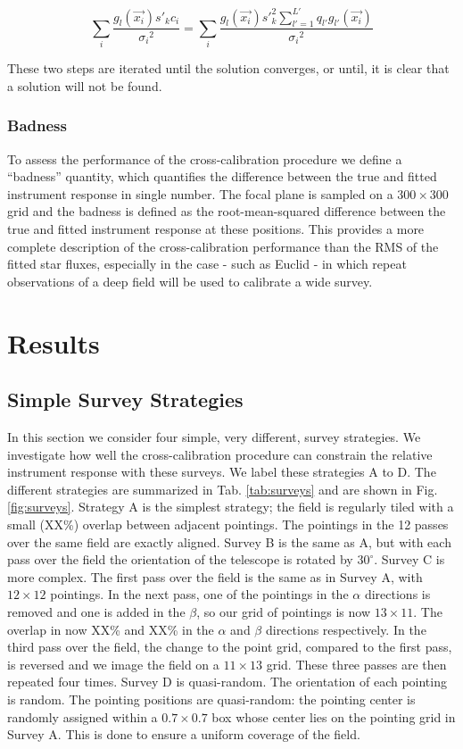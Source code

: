 \documentclass[manuscript]{aastex}
\begin{document}
\begin{displaymath}
\sum_{i} \frac{g_l(\vec{x_i}) s'_{k} c_i}{{\sigma_i}^2} = \sum_{i} \frac{g_l (\vec{x_i}) s'^2_{k} \sum_{l' = 1}^{L'} q_{l'} g_{l'} (\vec{x_i})} {{\sigma_i}^2}
\end{displaymath}

These two steps are iterated until the solution converges, or until, it is clear that a solution will not be found. 

\subsubsection{Badness}
To assess the performance of the cross-calibration procedure we define a ``badness'' quantity, which quantifies the difference between the true and fitted instrument response in single number. The focal plane is sampled on a $300 \times 300$ grid and the badness is defined as the root-mean-squared difference between the true and fitted instrument response at these positions. This provides a more complete description of the cross-calibration performance than the RMS of the fitted star fluxes, especially in the case - such as Euclid - in which repeat observations of a deep field will be used to calibrate a wide survey.

\section{Results}
\subsection{Simple Survey Strategies}
In this section we consider four simple, very different, survey strategies. We investigate how well the cross-calibration procedure can constrain the relative instrument response with these surveys. We label these strategies A to D. The different strategies are summarized in Tab. \ref{tab:surveys} and are shown in Fig. \ref{fig:surveys}. Strategy A is the simplest strategy; the field is regularly tiled with a small (XX\%) overlap between adjacent pointings. The pointings in the 12 passes over the same field are exactly aligned. Survey B is the same as A, but with each pass over the field the orientation of the telescope is rotated by $30^\circ$. Survey C is more complex. The first pass over the field is the same as in Survey A, with $12 \times 12$ pointings. In the next pass, one of the pointings in the $\alpha$ directions is removed and one is added in the $\beta$, so our grid of pointings is now $13 \times 11$. The overlap in now XX\% and XX\% in the $\alpha$ and $\beta$ directions respectively. In the third pass over the field, the change to the point grid, compared to the first pass, is reversed and we image the field on a $11 \times 13$ grid. These three passes are then repeated four times. Survey D is quasi-random. The orientation of each pointing is random. The pointing positions are quasi-random: the pointing center is randomly assigned within a $0.7 \times 0.7$ box whose center lies on the pointing grid in Survey A. This is done to ensure a uniform coverage of the field.
\end{document}
